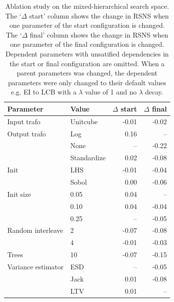 \begin{table}[H]
  \centering
  \caption{Ablation study on the mixed-hierarchical search space.
    The `$\Delta$ start' column shows the change in RSNS when one parameter of the start configuration is changed.
    The `$\Delta$ final' column shows the change in RSNS when one parameter of the final configuration is changed.
    Dependent parameters with unsatified dependencies in the start or final configuration are omitted.
    When a parent parameters was changed, the dependent parameters were only changed to their default values e.g. EI to LCB with a $\lambda$ value of 1 and no $\lambda$ decay.
  }
  \label{tab:ablation-mixed}
  \begin{tabular}{llrr}
    \toprule
    Parameter            & Value       & $\Delta$ start & $\Delta$ final \\
    \midrule
    Input trafo          & Unitcube    & -0.01          & -0.02          \\
    Output trafo         & Log         & 0.16           & --             \\
                         & None        & --             & -0.22          \\
                         & Standardize & 0.02           & -0.08          \\
    Init                 & LHS         & -0.01          & -0.04          \\
                         & Sobol       & 0.00           & -0.06          \\
    Init size            & 0.05        & 0.04           & --             \\
                         & 0.10        & 0.04           & -0.04          \\
                         & 0.25        & --             & -0.05          \\
    Random interleave    & 2           & -0.07          & -0.08          \\
                         & 4           & -0.01          & -0.03          \\
    Trees                & 10          & -0.07          & -0.15          \\
    Variance estimator   & ESD         & --             & -0.05          \\
                         & Jack        & 0.01           & -0.08          \\
                         & LTV         & 0.01           & --             \\

\end{tabular}
\end{table}

